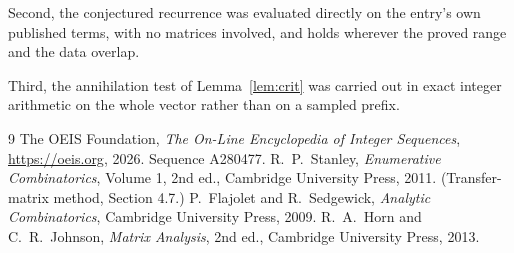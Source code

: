 \documentclass[11pt,a4paper]{article}
\theoremstyle{plain}
\theoremstyle{definition}
\begin{document}
Second, the conjectured recurrence was evaluated directly on the entry's own published terms,
with no matrices involved, and holds wherever the proved range and the data overlap.

Third, the annihilation test of Lemma~\ref{lem:crit} was carried out in exact integer
arithmetic on the whole vector rather than on a sampled prefix.

\begin{thebibliography}{9}
 The OEIS Foundation, \emph{The On-Line Encyclopedia of Integer
Sequences}, \url{https://oeis.org}, 2026. Sequence A280477.
 R.~P.~Stanley, \emph{Enumerative Combinatorics}, Volume 1, 2nd ed.,
Cambridge University Press, 2011. (Transfer-matrix method, Section 4.7.)
 P.~Flajolet and R.~Sedgewick, \emph{Analytic Combinatorics}, Cambridge
University Press, 2009.
 R.~A.~Horn and C.~R.~Johnson, \emph{Matrix Analysis}, 2nd ed., Cambridge
University Press, 2013.
\end{thebibliography}
\end{document}
